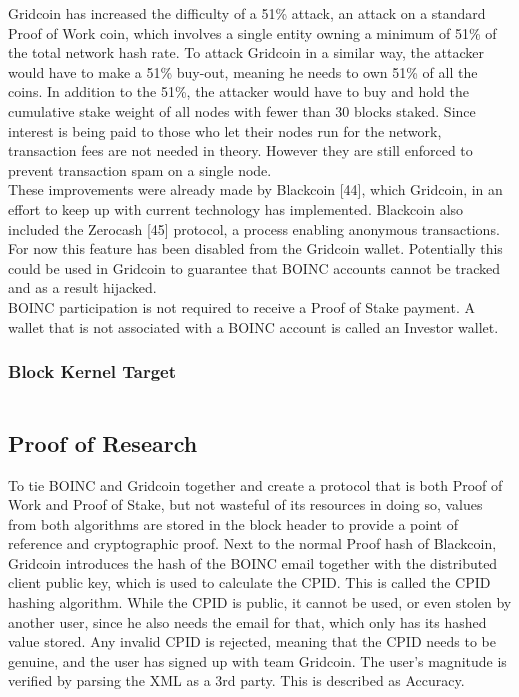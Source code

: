 Gridcoin has increased the difficulty of a 51\% attack, an attack on a standard Proof of Work coin, which involves a single entity owning a minimum of 51\% of the total network hash rate. To attack Gridcoin in a similar way, the attacker would have to make a 51\% buy-out, meaning he needs to own 51\% of all the coins. In addition to the 51\%, the attacker would have to buy and hold the cumulative stake weight of all nodes with fewer than 30 blocks staked. Since interest is being paid to those who let their nodes run for the network, transaction fees are not needed in theory. However they are still enforced to prevent transaction spam on a single node.\\

These improvements were already made by Blackcoin [44], which Gridcoin, in an effort to keep up with current technology has implemented. Blackcoin also included the Zerocash [45] protocol, a process enabling anonymous transactions. For now this feature has been disabled from the Gridcoin wallet. Potentially this could be used in Gridcoin to guarantee that BOINC accounts cannot be tracked and as a result hijacked.\\

BOINC participation is not required to receive a Proof of Stake payment. A wallet that is not associated with a BOINC account is called an Investor wallet.

\subsubsection{Block Kernel Target}

\begin{equation}
\end{equation}


\subsection{Proof of Research}

To tie BOINC and Gridcoin together and create a protocol that is both Proof of Work and Proof of Stake, but not wasteful of its resources in doing so, values from both algorithms are stored in the block header to provide a point of reference and cryptographic proof. Next to the normal Proof hash of Blackcoin, Gridcoin introduces the hash of the BOINC email together with the distributed client public key, which is used to calculate the CPID. This is called the CPID hashing algorithm. While the CPID is public, it cannot be used, or even stolen by another user, since he also needs the email for that, which only has its hashed value stored. Any invalid CPID is rejected, meaning that the CPID needs to be genuine, and the user has signed up with team Gridcoin. The user's magnitude is verified by parsing the XML as a 3rd party. This is described as Accuracy.\\

